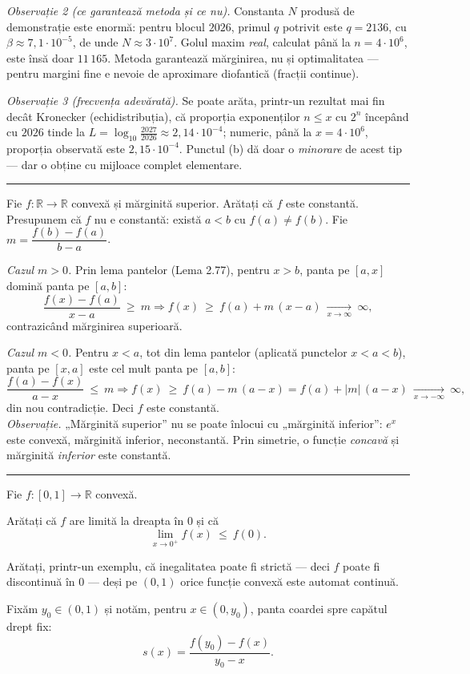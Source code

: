 \emph{Observație 2 (ce garantează metoda și ce nu).} Constanta $N$ produsă de demonstrație este enormă: pentru blocul $2026$, primul $q$ potrivit este $q=2136$, cu $\beta\approx7{,}1\cdot10^{-5}$, de unde $N\approx3\cdot10^{7}$. Golul maxim \emph{real}, calculat până la $n=4\cdot10^{6}$, este însă doar $11\,165$. Metoda garantează mărginirea, nu și optimalitatea --- pentru margini fine e nevoie de aproximare diofantică (fracții continue).

\emph{Observație 3 (frecvența adevărată).} Se poate arăta, printr-un rezultat mai fin decât Kronecker (echidistribuția), că proporția exponenților $n\le x$ cu $2^{n}$ începând cu $2026$ tinde la $L=\log_{10}\frac{2027}{2026}\approx2{,}14\cdot10^{-4}$; numeric, până la $x=4\cdot10^{6}$, proporția observată este $2{,}15\cdot10^{-4}$. Punctul (b) dă doar o \emph{minorare} de acest tip --- dar o obține cu mijloace complet elementare.
\vspace{1mm}\hrule

Fie $f:\mathbb{R}\to\mathbb{R}$ convexă și mărginită superior. Arătați că $f$ este constantă.
\sol Presupunem că $f$ nu e constantă: există $a<b$ cu $f(a)\neq f(b)$. Fie $m=\dfrac{f(b)-f(a)}{b-a}$.

\emph{Cazul $m>0$.} Prin lema pantelor (Lema 2.77), pentru $x>b$, panta pe $[a,x]$ domină panta pe $[a,b]$:
\[ \frac{f(x)-f(a)}{x-a}\ \ge\ m \Longrightarrow f(x)\ \ge\ f(a)+m\,(x-a)\ \xrightarrow[x\to\infty]{}\ \infty, \]
contrazicând mărginirea superioară.

\emph{Cazul $m<0$.} Pentru $x<a$, tot din lema pantelor (aplicată punctelor $x<a<b$), panta pe $[x,a]$ este cel mult panta pe $[a,b]$:
\[ \frac{f(a)-f(x)}{a-x}\ \le\ m \Longrightarrow f(x)\ \ge\ f(a)-m\,(a-x)=f(a)+|m|\,(a-x)\ \xrightarrow[x\to-\infty]{}\ \infty, \]
din nou contradicție. Deci $f$ este constantă.\\[2pt]
\emph{Observație.} „Mărginită superior'' nu se poate înlocui cu „mărginită inferior'': $e^x$ este convexă, mărginită inferior, neconstantă. Prin simetrie, o funcție \emph{concavă} și mărginită \emph{inferior} este constantă.
\vspace{1mm}\hrule

Fie $f:[0,1]\to\mathbb{R}$ convexă.
\begin{parti}
  \item Arătați că $f$ are limită la dreapta în $0$ și că
  \[ \lim_{x\to0^{+}}f(x)\ \le\ f(0) . \]
  \item Arătați, printr-un exemplu, că inegalitatea poate fi strictă --- deci $f$ poate fi discontinuă în $0$ --- deși pe $(0,1)$ orice funcție convexă este automat continuă.
\end{parti}
\sol Fixăm $y_{0}\in(0,1)$ și notăm, pentru $x\in(0,y_{0})$, panta coardei spre capătul drept fix:
\[ s(x)=\frac{f(y_{0})-f(x)}{y_{0}-x} . \]

